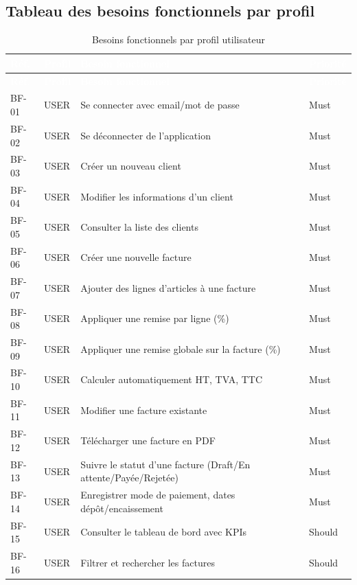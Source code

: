 \documentclass[12pt,a4paper]{report}
\begin{document}
\subsection{Tableau des besoins fonctionnels par profil}

\begin{longtable}{|l|l|X|l|}
\caption{Besoins fonctionnels par profil utilisateur} \label{tab:bf_profil} \\
\hline
\rowcolor{emsiblue}\textcolor{white}{\textbf{Réf.}} & \textcolor{white}{\textbf{Profil}} & \textcolor{white}{\textbf{Besoin fonctionnel}} & \textcolor{white}{\textbf{Priorité}} \\
\hline
\endfirsthead
\hline
\rowcolor{emsiblue}\textcolor{white}{\textbf{Réf.}} & \textcolor{white}{\textbf{Profil}} & \textcolor{white}{\textbf{Besoin fonctionnel}} & \textcolor{white}{\textbf{Priorité}} \\
\hline
\endhead
BF-01 & USER & Se connecter avec email/mot de passe & Must \\
BF-02 & USER & Se déconnecter de l'application & Must \\
BF-03 & USER & Créer un nouveau client & Must \\
BF-04 & USER & Modifier les informations d'un client & Must \\
BF-05 & USER & Consulter la liste des clients & Must \\
BF-06 & USER & Créer une nouvelle facture & Must \\
BF-07 & USER & Ajouter des lignes d'articles à une facture & Must \\
BF-08 & USER & Appliquer une remise par ligne (\%) & Must \\
BF-09 & USER & Appliquer une remise globale sur la facture (\%) & Must \\
BF-10 & USER & Calculer automatiquement HT, TVA, TTC & Must \\
BF-11 & USER & Modifier une facture existante & Must \\
BF-12 & USER & Télécharger une facture en PDF & Must \\
BF-13 & USER & Suivre le statut d'une facture (Draft/En attente/Payée/Rejetée) & Must \\
BF-14 & USER & Enregistrer mode de paiement, dates dépôt/encaissement & Must \\
BF-15 & USER & Consulter le tableau de bord avec KPIs & Should \\
BF-16 & USER & Filtrer et rechercher les factures & Should \\

\end{longtable}
\end{document}
